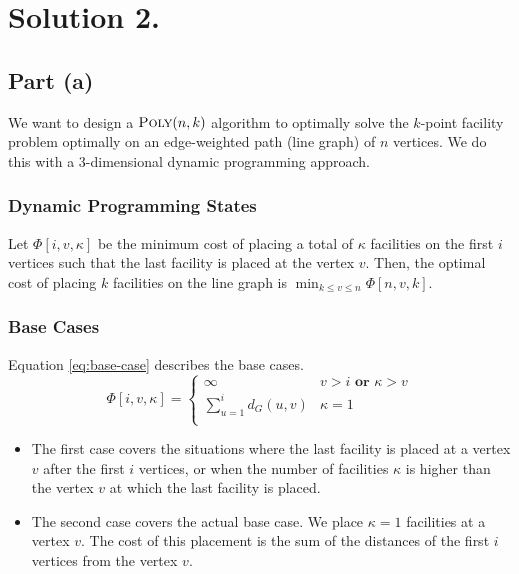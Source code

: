 \documentclass[9pt]{article}
\begin{document}
\section*{Solution 2.}
\subsection*{Part (a)}
We want to design a $\textsc{Poly}(n, k)$ algorithm to optimally solve the $k$-point facility
problem optimally on an edge-weighted path (line graph) of $n$ vertices. We do this with a
3-dimensional dynamic programming approach.

\subsubsection*{Dynamic Programming States}
Let $\Phi[i, v, \kappa]$ be the minimum cost of placing a total of $\kappa$ facilities
on the first $i$ vertices such that the last facility is placed at the vertex $v$. Then,
the optimal cost of placing $k$ facilities on the line graph is
$\min_{k \leq v \leq n} \Phi[n, v, k]$.

\subsubsection*{Base Cases}
Equation \ref{eq:base-case} describes the base cases.
\begin{equation}
    \label{eq:base-case}
    \Phi[i, v, \kappa] = \begin{cases}
        \infty & v > i \textbf{ or } \kappa > v \\
        \sum_{u = 1}^{i} d_{G}(u, v) & \kappa = 1 \\
    \end{cases}
\end{equation}
\begin{itemize}
    \item The first case covers the situations where the last facility is placed at a vertex
    $v$ after the first $i$ vertices, or when the number of facilities $\kappa$ is higher
    than the vertex $v$ at which the last facility is placed.
    \item The second case covers the actual base case. We place $\kappa = 1$ facilities at a
    vertex $v$. The cost of this placement is the sum of the distances of the first $i$
    vertices from the vertex $v$.
\end{itemize}
\end{document}
